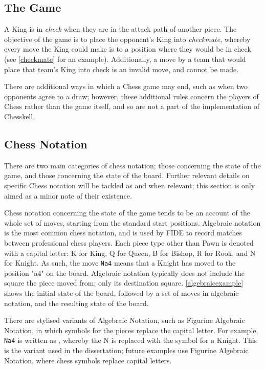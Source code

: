\documentclass[12pt, a4paper, bibliography=totocnumbered]{scrreprt}
\begin{document}
\subsection{The Game}

A King is in \emph{check} when they are in the attack path of another piece. The objective of the game is to place the opponent's King into \emph{checkmate}, whereby every move the King could make is to a position where they would be in check (see \cref{checkmate} for an example). Additionally, a move by a team that would place that team's King into check is an invalid move, and cannot be made.

There are additional ways in which a Chess game may end, such as when two opponents agree to a draw; however, these additional rules concern the players of Chess rather than the game itself, and so are not a part of the implementation of Chesskell.

\subsection{Chess Notation} \label{fensection}

There are two main categories of chess notation; those concerning the state of the game, and those concerning the state of the board. Further relevant details on specific Chess notation will be tackled as and when relevant; this section is only aimed as a minor note of their existence.

Chess notation concerning the state of the game tends to be an account of the whole set of moves, starting from the standard start positions. Algebraic notation is the most common chess notation, and is used by FIDE to record matches between professional chess players. Each piece type other than Pawn is denoted with a capital letter: K for King, Q for Queen, B for Bishop, R for Rook, and N for Knight. As such, the move \texttt{Na4} means that a Knight has moved to the position "a4" on the board. Algebraic notation typically does not include the square the piece moved from; only its destination square. \cref{algebraicexample} shows the initial state of the board, followed by a set of moves in algebraic notation, and the resulting state of the board.

There are stylised variants of Algebraic Notation, such as Figurine Algebraic Notation, in which symbols for the pieces replace the capital letter. For example, \texttt{Na4} is written as , whereby the N is replaced with the symbol for a Knight. This is the variant used in the dissertation; future examples use Figurine Algebraic Notation, where chess symbols replace capital letters.
\end{document}
